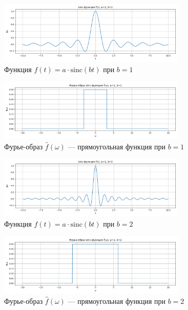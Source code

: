 \begin{figure}[H]
    \centering
    \includegraphics[width=0.8\textwidth]{sinc_function_b1.png}
    \caption{Функция $f(t) = a \cdot \mathrm{sinc}(bt)$ при $b = 1$}
\end{figure}

\begin{figure}[H]
    \centering
    \includegraphics[width=0.8\textwidth]{sinc_spectrum_b1.png}
    \caption{Фурье-образ $\hat{f}(\omega)$ — прямоугольная функция при $b = 1$}
\end{figure}

\begin{figure}[H]
    \centering
    \includegraphics[width=0.8\textwidth]{sinc_function_b2.png}
    \caption{Функция $f(t) = a \cdot \mathrm{sinc}(bt)$ при $b = 2$}
\end{figure}

\begin{figure}[H]
    \centering
    \includegraphics[width=0.8\textwidth]{sinc_spectrum_b2.png}
    \caption{Фурье-образ $\hat{f}(\omega)$ — прямоугольная функция при $b = 2$}
\end{figure}

